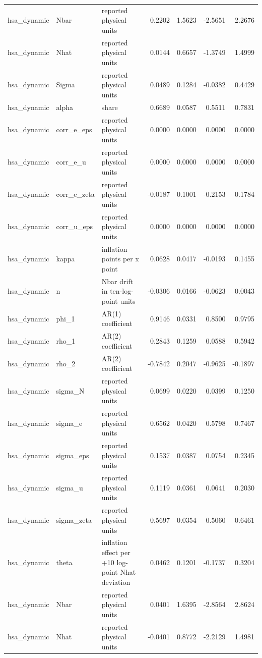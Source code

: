 \begin{tabular}{lllrrrr}
hsa\_dynamic & Nbar & reported physical units & 0.2202 & 1.5623 & -2.5651 & 2.2676 \\
hsa\_dynamic & Nhat & reported physical units & 0.0144 & 0.6657 & -1.3749 & 1.4999 \\
hsa\_dynamic & Sigma & reported physical units & 0.0489 & 0.1284 & -0.0382 & 0.4429 \\
hsa\_dynamic & alpha & share & 0.6689 & 0.0587 & 0.5511 & 0.7831 \\
hsa\_dynamic & corr\_e\_eps & reported physical units & 0.0000 & 0.0000 & 0.0000 & 0.0000 \\
hsa\_dynamic & corr\_e\_u & reported physical units & 0.0000 & 0.0000 & 0.0000 & 0.0000 \\
hsa\_dynamic & corr\_e\_zeta & reported physical units & -0.0187 & 0.1001 & -0.2153 & 0.1784 \\
hsa\_dynamic & corr\_u\_eps & reported physical units & 0.0000 & 0.0000 & 0.0000 & 0.0000 \\
hsa\_dynamic & kappa & inflation points per x point & 0.0628 & 0.0417 & -0.0193 & 0.1455 \\
hsa\_dynamic & n & Nbar drift in ten-log-point units & -0.0306 & 0.0166 & -0.0623 & 0.0043 \\
hsa\_dynamic & phi\_1 & AR(1) coefficient & 0.9146 & 0.0331 & 0.8500 & 0.9795 \\
hsa\_dynamic & rho\_1 & AR(2) coefficient & 0.2843 & 0.1259 & 0.0588 & 0.5942 \\
hsa\_dynamic & rho\_2 & AR(2) coefficient & -0.7842 & 0.2047 & -0.9625 & -0.1897 \\
hsa\_dynamic & sigma\_N & reported physical units & 0.0699 & 0.0220 & 0.0399 & 0.1250 \\
hsa\_dynamic & sigma\_e & reported physical units & 0.6562 & 0.0420 & 0.5798 & 0.7467 \\
hsa\_dynamic & sigma\_eps & reported physical units & 0.1537 & 0.0387 & 0.0754 & 0.2345 \\
hsa\_dynamic & sigma\_u & reported physical units & 0.1119 & 0.0361 & 0.0641 & 0.2030 \\
hsa\_dynamic & sigma\_zeta & reported physical units & 0.5697 & 0.0354 & 0.5060 & 0.6461 \\
hsa\_dynamic & theta & inflation effect per +10 log-point Nhat deviation & 0.0462 & 0.1201 & -0.1737 & 0.3204 \\
hsa\_dynamic & Nbar & reported physical units & 0.0401 & 1.6395 & -2.8564 & 2.8624 \\
hsa\_dynamic & Nhat & reported physical units & -0.0401 & 0.8772 & -2.2129 & 1.4981 \\

\end{tabular}
